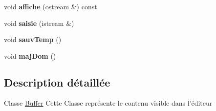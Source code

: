 \begin{DoxyCompactItemize}
\item 
\hypertarget{classBuffer_a89c9eac6ff51f0e9b2e8eaddd1c56bd0}{
void {\bfseries affiche} (ostream \&) const }
\label{classBuffer_a89c9eac6ff51f0e9b2e8eaddd1c56bd0}

\item 
\hypertarget{classBuffer_a9dddb1a46c258c5db1ed04a101e0a5cd}{
void {\bfseries saisie} (istream \&)}
\label{classBuffer_a9dddb1a46c258c5db1ed04a101e0a5cd}

\item 
\hypertarget{classBuffer_aa9f3fc3d9114811eba3029072eaf10fa}{
void {\bfseries sauvTemp} ()}
\label{classBuffer_aa9f3fc3d9114811eba3029072eaf10fa}

\item 
\hypertarget{classBuffer_af80b627f4d24823d0e7da5b9c15cbd46}{
void {\bfseries majDom} ()}
\label{classBuffer_af80b627f4d24823d0e7da5b9c15cbd46}

\end{DoxyCompactItemize}


\subsection{Description détaillée}
Classe \hyperlink{classBuffer}{Buffer} Cette Classe représente le contenu visible dans l'éditeur 

